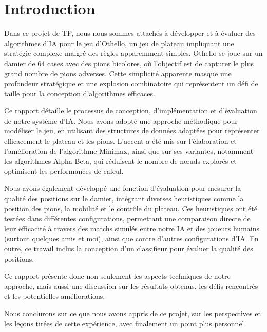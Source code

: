 \chapter{Introduction}
\label{chap:introduction}

Dans ce projet de \ac{TP}, nous nous sommes attachés à développer et à évaluer des algorithmes d'\ac{IA} pour le jeu d'Othello, un jeu de plateau impliquant une stratégie complexe malgré des règles apparemment simples. Othello se joue sur un damier de 64 cases avec des pions bicolores, où l'objectif est de capturer le plus grand nombre de pions adverses. Cette simplicité apparente masque une profondeur stratégique et une explosion combinatoire qui représentent un défi de taille pour la conception d'algorithmes efficaces.

Ce rapport détaille le processus de conception, d'implémentation et d'évaluation de notre système d'\ac{IA}. Nous avons adopté une approche méthodique pour modéliser le jeu, en utilisant des structures de données adaptées pour représenter efficacement le plateau et les pions. L'accent a été mis sur l'élaboration et l'amélioration de l'algorithme Minimax, ainsi que sur ses variantes, notamment les algorithmes Alpha-Beta, qui réduisent le nombre de nœuds explorés et optimisent les performances de calcul.

Nous avons également développé une fonction d'évaluation pour mesurer la qualité des positions sur le damier, intégrant diverses heuristiques comme la position des pions, la mobilité et le contrôle du plateau. Ces heuristiques ont été testées dans différentes configurations, permettant une comparaison directe de leur efficacité à travers des matchs simulés entre notre \ac{IA} et des joueurs humains (surtout quelques amis et moi), ainsi que contre d'autres configurations d'\ac{IA}. En outre, ce travail inclus la conception d'un classifieur pour évaluer la qualité des positions. 

Ce rapport présente donc non seulement les aspects techniques de notre approche, mais aussi une discussion sur les résultats obtenus, les défis rencontrés et les potentielles améliorations.

Nous conclurons sur ce que nous avons appris de ce projet, sur les perspectives et les leçons tirées de cette expérience, avec finalement un point plus personnel.